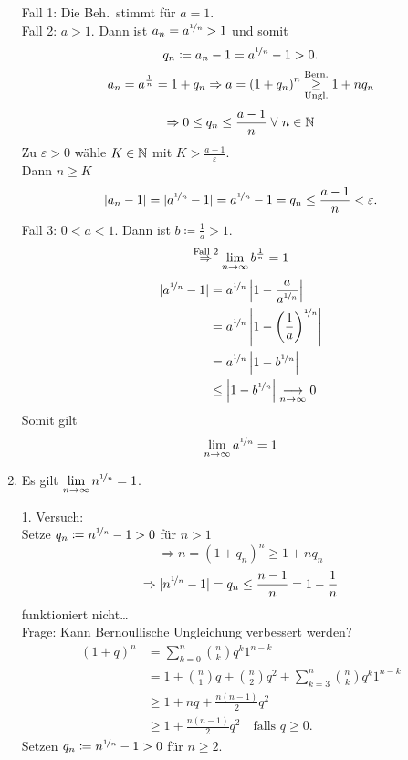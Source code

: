 \documentclass[../ana1.tex]{subfiles}
\begin{document}
\begin{bsp}
\begin{enumerate}
\begin{bew}
			Fall 1: Die Beh.\ stimmt für \( a=1 \).\\
			Fall 2: \(a>1\). Dann ist 
			\(a_n = a^{\nicefrac{1}{n}}>1\) 
			und somit 
			\[ q_n \coloneqq a_n-1 
			= a^{\nicefrac{1}{n}} -1 >0. \]
			\[a_n = a^{\frac{1}{n}} = 1+q_n \Rightarrow a = {(1+q_n)}^n \overset{\text{Bern.}}{\underset{\text{Ungl.}}{\geq}} 1+ nq_n\]
			\[\Rightarrow 0 \leq q_n \leq \frac{a-1}{n} \; \forall \, n\in\N \]
			Zu \(\varepsilon > 0\) wähle \(K\in\mathbb{N} \) mit \(K>\frac{a-1}{\varepsilon}\).\\
			Dann \(n\geq K\)
			\[|a_n-1| = |a^{\nicefrac{1}{n}}-1|= a^{\nicefrac{1}{n}} -1 = q_n \leq \frac{a-1}{n} < \varepsilon.\]
			Fall 3: \(0<a<1\). Dann ist \(b \coloneqq \frac{1}{a}>1\).
			\[\overset{\text{Fall 2}}{\Rightarrow} \lim\limits_{n\rightarrow\infty} b^{\frac{1}{n}} = 1\]
			\begin{align*}
				|a^{\nicefrac{1}{n}}-1|&=a^{\nicefrac{1}{n}}\left|1-\frac{a}{a^{\nicefrac{1}{n}}}\right|\\
				&= a^{\nicefrac{1}{n}}\left| 1 - {\left(\frac{1}{a}\right)}^{\nicefrac{1}{n}} \right|\\
				&= a^{\nicefrac{1}{n}} \left|1-b^{\nicefrac{1}{n}}\right|\\
				&\leq \left|1-b^{\nicefrac{1}{n}} \right|\underset{n\rightarrow\infty}{\longrightarrow} 0
			\end{align*}
			Somit gilt
			\[\lim\limits_{n\rightarrow\infty} a^{\nicefrac{1}{n}} = 1\]
		\end{bew}
	\item Es gilt \(\lim\limits_{n\rightarrow\infty}n^{\nicefrac{1}{n}}=1\).
	\begin{bew}
		1. Versuch:\\
		Setze \(q_n \coloneqq n^{\nicefrac{1}{n}} -1>0\) für \(n>1\) \\
		\[\Rightarrow n={(1+q_n)}^n \geq 1+nq_n\]
		\[\Rightarrow |n^{\nicefrac{1}{n}}-1| = q_n \leq \frac{n-1}{n} = 1-\frac{1}{n}\]
		funktioniert nicht\dots \\
		Frage: Kann Bernoullische Ungleichung verbessert werden?\\
		\begin{align*}
			{(1+q)}^n &= \sum_{k=0}^{n} \binom{n}{k} q^k1^{n-k}\\
			&=1+\binom{n}{1}q + \binom{n}{2}q^2 + \sum_{k=3}^{n}\binom{n}{k} q^k1^{n-k}\\
			&\geq 1+nq + \frac{n(n-1)}{2} q^2\\
			&\geq 1+\frac{n(n-1)}{2} q^2 \quad\text{falls }	q\geq 0. \tag{\(*\)}
		\end{align*}
		Setzen \(q_n \coloneqq n^{\nicefrac{1}{n}} -1 >0\) für \(n\geq 2\).

\end{bew}
\end{enumerate}
\end{bsp}
\end{document}
